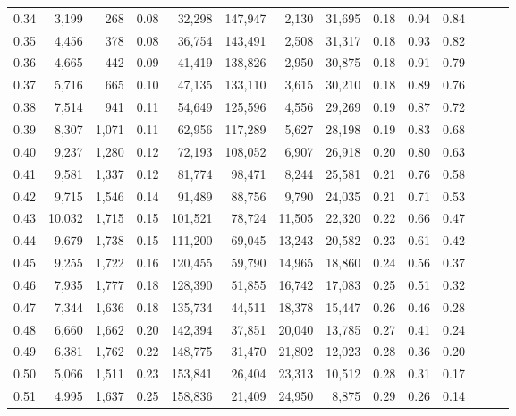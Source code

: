 \begin{tabular}{rrrrrrrrrrrrrr}
0.34 &   3,199 &    268 &  0.08 &   32,298 &  147,947 &   2,130 &  31,695 &  0.18 &  0.94 &      0.84 \\
0.35 &   4,456 &    378 &  0.08 &   36,754 &  143,491 &   2,508 &  31,317 &  0.18 &  0.93 &      0.82 \\
0.36 &   4,665 &    442 &  0.09 &   41,419 &  138,826 &   2,950 &  30,875 &  0.18 &  0.91 &      0.79 \\
0.37 &   5,716 &    665 &  0.10 &   47,135 &  133,110 &   3,615 &  30,210 &  0.18 &  0.89 &      0.76 \\
0.38 &   7,514 &    941 &  0.11 &   54,649 &  125,596 &   4,556 &  29,269 &  0.19 &  0.87 &      0.72 \\
0.39 &   8,307 &  1,071 &  0.11 &   62,956 &  117,289 &   5,627 &  28,198 &  0.19 &  0.83 &      0.68 \\
0.40 &   9,237 &  1,280 &  0.12 &   72,193 &  108,052 &   6,907 &  26,918 &  0.20 &  0.80 &      0.63 \\
0.41 &   9,581 &  1,337 &  0.12 &   81,774 &   98,471 &   8,244 &  25,581 &  0.21 &  0.76 &      0.58 \\
0.42 &   9,715 &  1,546 &  0.14 &   91,489 &   88,756 &   9,790 &  24,035 &  0.21 &  0.71 &      0.53 \\
0.43 &  10,032 &  1,715 &  0.15 &  101,521 &   78,724 &  11,505 &  22,320 &  0.22 &  0.66 &      0.47 \\
0.44 &   9,679 &  1,738 &  0.15 &  111,200 &   69,045 &  13,243 &  20,582 &  0.23 &  0.61 &      0.42 \\
0.45 &   9,255 &  1,722 &  0.16 &  120,455 &   59,790 &  14,965 &  18,860 &  0.24 &  0.56 &      0.37 \\
0.46 &   7,935 &  1,777 &  0.18 &  128,390 &   51,855 &  16,742 &  17,083 &  0.25 &  0.51 &      0.32 \\
0.47 &   7,344 &  1,636 &  0.18 &  135,734 &   44,511 &  18,378 &  15,447 &  0.26 &  0.46 &      0.28 \\
0.48 &   6,660 &  1,662 &  0.20 &  142,394 &   37,851 &  20,040 &  13,785 &  0.27 &  0.41 &      0.24 \\
0.49 &   6,381 &  1,762 &  0.22 &  148,775 &   31,470 &  21,802 &  12,023 &  0.28 &  0.36 &      0.20 \\
0.50 &   5,066 &  1,511 &  0.23 &  153,841 &   26,404 &  23,313 &  10,512 &  0.28 &  0.31 &      0.17 \\
0.51 &   4,995 &  1,637 &  0.25 &  158,836 &   21,409 &  24,950 &   8,875 &  0.29 &  0.26 &      0.14 \\

\end{tabular}
